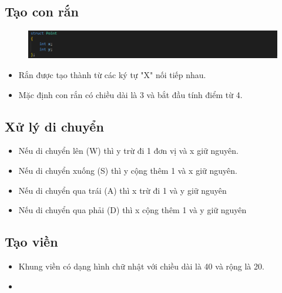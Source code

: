 \documentclass[../main-report.tex]{subfiles}
\begin{document}
\subsection{Tạo con rắn}
\begin{figure}[ht]
    \centering
    \includegraphics[scale=0.6]{hinh/snake1.png}
\end{figure}
\begin{itemize}
    \item Rắn được tạo thành từ các ký tự "X" nối tiếp nhau.
    \item Mặc định con rắn có chiều dài là 3 và bắt đầu tính điểm từ 4.
\end{itemize}
\subsection{Xử lý di chuyển}
\begin{itemize}
    \item Nếu di chuyển lên (W) thì y trừ đi 1 đơn vị và x giữ nguyên.
    \item Nếu di chuyển xuống (S) thì y cộng thêm 1 và x giữ nguyên.
    \item Nếu di chuyển qua trái (A) thì x trừ đi 1 và y giữ nguyên
    \item Nếu di chuyển qua phải (D) thì x cộng thêm 1 và y giữ nguyên
\end{itemize}

\subsection{Tạo viền}
\begin{itemize}
    \item Khung viền có dạng hình chữ nhật với chiều dài là 40 và rộng là 20.
    \item
\end{itemize}
\end{document}
